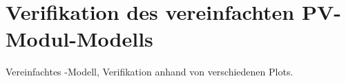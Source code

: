 \chapter{Verifikation des vereinfachten PV-Modul-Modells}
\label{app:simu:module:simple}

Vereinfachtes  -Modell,  Verifikation anhand  von  verschiedenen
Plots.
